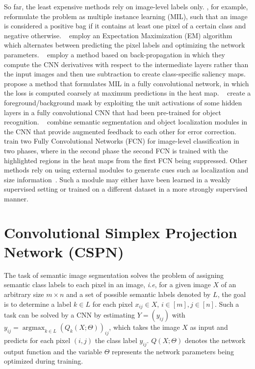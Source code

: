 \documentclass{bmvc2k}
\def\ie{\emph{i.e}\bmvaOneDot}
\DeclareMathOperator*{\argmax}{\mathrm{argmax}}
\begin{document}
So far, the least expensive methods rely on image-level labels only. \citet{pinheiro2015image}, for example, reformulate the problem as multiple instance learning (MIL), such that an image is considered a positive bag if it contains at least one pixel of a certain class and negative otherwise. ~\citet{chen2018deeplab} employ an Expectation Maximization (EM) algorithm which alternates between predicting the pixel labels and optimizing the network parameters. ~\citet{Shimoda2016DistinctCS} employ a method based on back-propagation in which they compute the CNN derivatives with respect to the intermediate layers rather than the input images and then use subtraction to create class-specific saliency maps. \citet{pathakICLR15} propose a method that formulates MIL in a fully convolutional network, in which the loss is computed coarsely at maximum predictions in the heat map. ~\citet{saleh2016built} create a foreground/background mask by exploiting
the unit activations of some hidden layers in a fully convolutional CNN that had been pre-trained for object recognition.
~\citet{qi2016augmented} combine semantic segmentation and object localization modules in the CNN that provide augmented feedback to each other for error correction.~\citet{kim2017two} train two Fully Convolutional Networks (FCN) for image-level classification in two phases, where in the second phase the second FCN is trained with the highlighted regions in the heat maps from the first FCN being suppressed. Other methods rely on using external modules to generate cues such as localization and size information~\cite{kolesnikov2016seed, chaudhry2017discovering}. Such a module may either have been learned in a weakly supervised setting or trained on a different dataset in a more strongly supervised manner. 

\section{Convolutional Simplex Projection Network (CSPN)}

The task of semantic image segmentation solves the problem of assigning semantic class labels to each pixel in an image, \ie, for a given image $X$ of an arbitrary size ${m\times n}$ and a set of possible semantic labels denoted by $L$, the goal is to determine a label $k\in L$ for each pixel $x_{ij}\in X$, $i\in[m], j\in[n]$. Such a task can be solved by a CNN by estimating $Y=(y_{ij})$ with $y_{ij}=\argmax_{k\in L} (Q_k(X;\Theta))_{ij}$, which takes the image $X$ as input and predicts for each pixel $(i,j)$ the class label $y_{ij}$. $Q(X;\Theta)$ denotes the network output function and the variable $\Theta$ represents the network parameters being optimized during training. 
\end{document}
